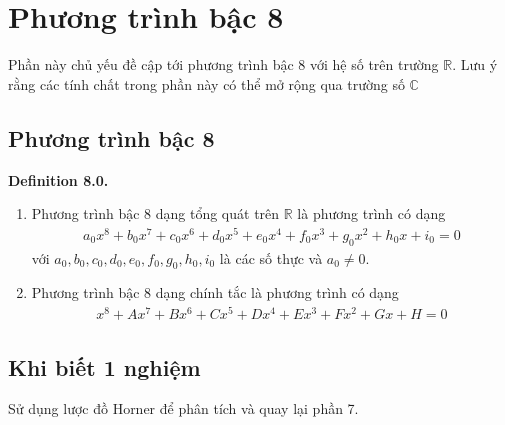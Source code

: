 \documentclass[a4paper,oneside]{book}
\numberwithin{equation}{chapter}
\begin{document}
\chapter{Phương trình bậc 8}
Phần này chủ yếu đề cập tới phương trình bậc 8 với hệ số trên trường $\mathbb{R}$. Lưu ý rằng các tính chất trong phần này có thể mở rộng qua trường số $\mathbb{C}$
\section{Phương trình bậc 8}
\textbf{Definition 8.0.} 
\begin{enumerate}
\item Phương trình bậc 8 dạng tổng quát trên $\mathbb{R}$ là phương trình có dạng
\begin{align}
{a_0}{x^8} + {b_0}{x^7} + {c_0}{x^6} + {d_0}x^5 + {e_0}x^4+f_0x^3+g_0x^2+h_0x+i_0 = 0
\end{align}
với $a_0,b_0,c_0,d_0,e_0,f_0,g_0,h_0,i_0$ là các số thực và $a_0 \ne 0$.
\item  Phương trình bậc 8 dạng chính tắc là phương trình có dạng
\begin{align}
{x^8} + A{x^7} + B{x^6} + C{x^5} + D{x^4} + E{x^3} + F{x^2} + Gx + H = 0
\end{align}

\end{enumerate}

\section{Khi biết 1 nghiệm}
Sử dụng lược đồ Horner để phân tích và quay lại phần 7.
\end{document}
